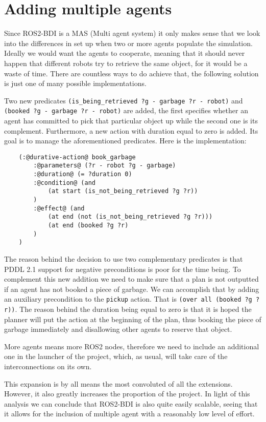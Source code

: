 \section{Adding multiple agents}
Since ROS2-BDI is a MAS (Multi agent system) it only makes sense that we look into the differences in set up when two or more agents populate the simulation. Ideally we would want the agents to cooperate, meaning that it should never happen that different robots try to retrieve the same object, for it would be a waste of time.
There are countless ways to do achieve that, the following solution is just one of many possible implementations.
\par
Two new predicates \texttt{(is\_being\_retrieved ?g - garbage ?r - robot)} and \texttt{(booked ?g - garbage ?r - robot)} are added, the first specifies whether an agent has committed to pick that particular object up while the second one is its complement. Furthermore, a new action with duration equal to zero is added. Its goal is to manage the aforementioned predicates. Here is the implementation:
\begin{lstlisting}
    (:@durative-action@ book_garbage
        :@parameters@ (?r - robot ?g - garbage)
        :@duration@ (= ?duration 0)
        :@condition@ (and 
            (at start (is_not_being_retrieved ?g ?r))
        )
        :@effect@ (and 
            (at end (not (is_not_being_retrieved ?g ?r)))
            (at end (booked ?g ?r)
        )
    )
\end{lstlisting}
The reason behind the decision to use two complementary predicates is that PDDL 2.1 support for negative preconditions is poor for the time being.
To complement this new addition we need to make sure that a plan is not outputted if an agent has not booked a piece of garbage. We can accomplish that by adding an auxiliary precondition to the \texttt{pickup} action. That is \texttt{(over all (booked ?g ?r))}.
The reason behind the duration being equal to zero is that it is hoped the planner will put the action at the beginning of the plan, thus booking the piece of garbage immediately and disallowing other agents to reserve that object.
\par
More agents means more ROS2 nodes, therefore we need to include an additional one in the launcher of the project, which, as usual, will take care of the interconnections on its own.
\par
This expansion is by all means the most convoluted of all the extensions. However, it also greatly increases the proportion of the project. In light of this analysis we can conclude that ROS2-BDI is also quite easily scalable, seeing that it allows for the inclusion of multiple agent with a reasonably low level of effort.
\newpage
